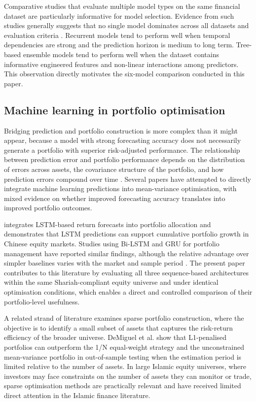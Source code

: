 Comparative studies that evaluate multiple model types on the same financial
dataset are particularly informative for model selection. Evidence from such
studies generally suggests that no single model dominates across all datasets
and evaluation criteria \citep{zhang2023stock, kuang2023comparison}. Recurrent
models tend to perform well when temporal dependencies are strong and the
prediction horizon is medium to long term. Tree-based ensemble models tend
to perform well when the dataset contains informative engineered features and
non-linear interactions among predictors. This observation directly motivates
the six-model comparison conducted in this paper.

\subsection{Machine learning in portfolio optimisation}

Bridging prediction and portfolio construction is more complex than it might
appear, because a model with strong forecasting accuracy does not necessarily
generate a portfolio with superior risk-adjusted performance. The relationship
between prediction error and portfolio performance depends on the distribution
of errors across assets, the covariance structure of the portfolio, and how
prediction errors compound over time \citep{brandt2010portfolio}. Several
papers have attempted to directly integrate machine learning predictions into
mean-variance optimisation, with mixed evidence on whether improved forecasting
accuracy translates into improved portfolio outcomes.

\citet{lu2023lstm} integrates LSTM-based return forecasts into portfolio
allocation and demonstrates that LSTM predictions can support cumulative
portfolio growth in Chinese equity markets. Studies using Bi-LSTM and GRU
for portfolio management have reported similar findings, although the relative
advantage over simpler baselines varies with the market and sample period
\citep{hamayel2021bilstm}. The present paper contributes to this literature
by evaluating all three sequence-based architectures within the same
Shariah-compliant equity universe and under identical optimisation conditions,
which enables a direct and controlled comparison of their portfolio-level usefulness.

A related strand of literature examines sparse portfolio construction, where
the objective is to identify a small subset of assets that captures the risk-return
efficiency of the broader universe. DeMiguel et al. show that L1-penalised
portfolios can outperform the 1/N equal-weight strategy and the unconstrained
mean-variance portfolio in out-of-sample testing when the estimation period
is limited relative to the number of assets. In large Islamic equity universes,
where investors may face constraints on the number of assets they can monitor
or trade, sparse optimisation methods are practically relevant and have received
limited direct attention in the Islamic finance literature.

